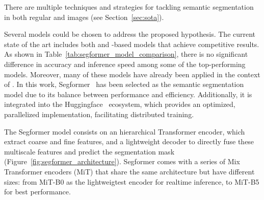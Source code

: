 There are multiple techniques and strategies for tackling semantic segmentation in both regular and  images (see Section~\ref{sec:sota}).  

Several models could be chosen to address the proposed hypothesis. The current state of the art includes both  and -based models that achieve competitive results. As shown in Table~\ref{tab:segformer_model_comparison}, there is no significant difference in accuracy and inference speed among some of the top-performing models. Moreover, many of these models have already been applied in the context of . In this work, Segformer~\cite{segformer} has been selected as the semantic segmentation model due to its balance between performance and efficiency. Additionally, it is integrated into the Huggingface~\cite{huggingface} ecosystem, which provides an optimized, parallelized implementation, facilitating distributed training.  

\begin{table}[h]
    \centering
    \caption{Comparison of different models. Results are obtained from \cite{DDRNet} \cite{PIDNet} \cite{segformer}.  }
    \label{tab:segformer_model_comparison}
\end{table}


The Segformer model consists on an hierarchical Transformer  encoder, which extract coarse and fine features, and a lightweight  decoder to directly fuse these multiscale features and predict the segmentation mask (Figure~\ref{fig:segformer_architecture}). Segformer comes with a series of Mix Transformer encoders (MiT) that share the same architecture but have different sizes: from MiT-B0 as the lightweigtest encoder for realtime inference, to MiT-B5 for best performance.

